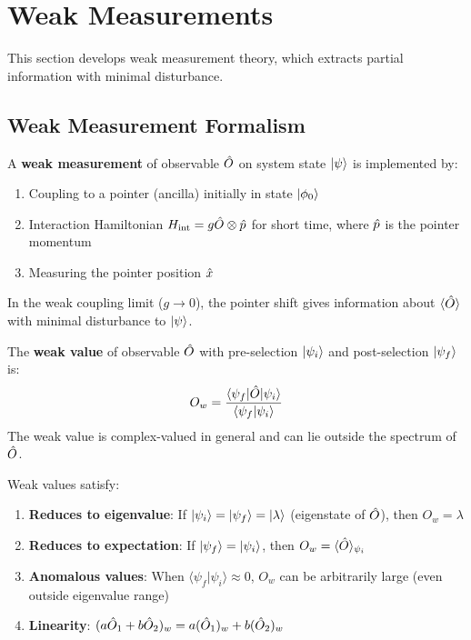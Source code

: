 \section{Weak Measurements}
\label{sec:weak-measurements}

This section develops weak measurement theory, which extracts partial information with minimal disturbance.

\subsection{Weak Measurement Formalism}

\begin{definition}
\label{def:weak-measurement}
A \textbf{weak measurement} of observable $\hat{O}$ on system state $|\psi\rangle$ is implemented by:
\begin{enumerate}
  \item Coupling to a pointer (ancilla) initially in state $|\phi_0\rangle$
  \item Interaction Hamiltonian $H_{\mathrm{int}} = g \hat{O} \otimes \hat{p}$ for short time, where $\hat{p}$ is the pointer momentum
  \item Measuring the pointer position $\hat{x}$
\end{enumerate}
In the weak coupling limit ($g \to 0$), the pointer shift gives information about $\langle \hat{O} \rangle$ with minimal disturbance to $|\psi\rangle$.
\end{definition}

\begin{definition}
\label{def:weak-value}
The \textbf{weak value} of observable $\hat{O}$ with pre-selection $|\psi_i\rangle$ and post-selection $|\psi_f\rangle$ is:
\[
O_w = \frac{\langle \psi_f|\hat{O}|\psi_i\rangle}{\langle\psi_f|\psi_i\rangle}
\]
The weak value is complex-valued in general and can lie outside the spectrum of $\hat{O}$.
\end{definition}

\begin{proposition}
\label{prop:weak-value-props}
Weak values satisfy:
\begin{enumerate}
  \item \textbf{Reduces to eigenvalue}: If $|\psi_i\rangle = |\psi_f\rangle = |\lambda\rangle$ (eigenstate of $\hat{O}$), then $O_w = \lambda$
  \item \textbf{Reduces to expectation}: If $|\psi_f\rangle = |\psi_i\rangle$, then $O_w = \langle \hat{O} \rangle_{\psi_i}$
  \item \textbf{Anomalous values}: When $\langle\psi_f|\psi_i\rangle \approx 0$, $O_w$ can be arbitrarily large (even outside eigenvalue range)
  \item \textbf{Linearity}: $(a\hat{O}_1 + b\hat{O}_2)_w = a(\hat{O}_1)_w + b(\hat{O}_2)_w$
\end{enumerate}
\end{proposition}

